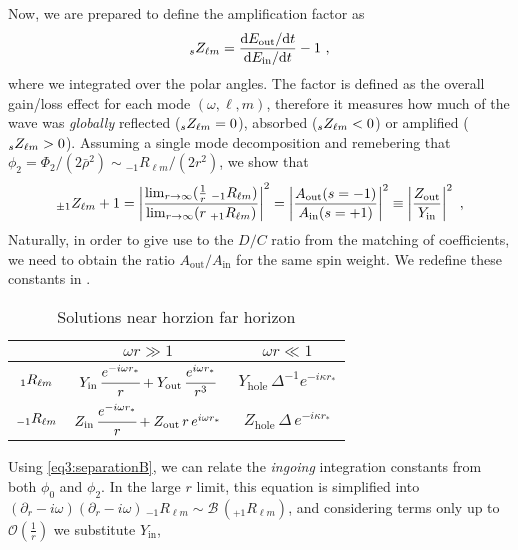 Now, we are prepared to define the amplification factor as 
\begin{align}
    \label{eq3:Zdef}
    \uu[s]{Z}{\ell m} = \frac{\dd E_\mathrm{out} / \dd t}{\dd E_\mathrm{in} / \dd t} - 1 ~,
\end{align}
where we integrated over the polar angles.
The factor is defined as the overall gain/loss effect for each mode $(\omega,\ell,m)$, therefore it measures how much of the wave was \emph{globally} reflected ($\uu[s]{Z}{\ell m}=0$), absorbed ($\uu[s]{Z}{\ell m}<0$) or amplified ($\uu[s]{Z}{\ell m}>0$).
Assuming a single mode decomposition and remebering that $\phi_2 = \Phi_2/(2 \bar{\rho}^2) \sim {}_{-1}R_{\ell m}/(2 r^2)$, we show that
\begin{align}
    \label{eq3:ZfactorAout2Ain0}
    \uu[\pm1]{Z}{\ell m} +1= \left| \frac{\lim_{r\to\infty} (\tfrac{1}{r} \; {}_{-1}R_{\ell m} )}{\lim_{r\to\infty} ( r \; {}_{+1}R_{\ell m} )} \right|^2 = \left| \frac{A_\mathrm{out}(s=-1)}{A_\mathrm{in}(s=+1)} \right|^2 \equiv \left| \frac{Z_\mathrm{out}}{Y_\mathrm{in}} \right|^2 ~,
\end{align}
Naturally, in order to give use to the $D/C$ ratio from the matching of coefficients, we need to obtain the ratio $A_\mathrm{out}/A_\mathrm{in}$ for the same spin weight. We redefine these constants in .
\begin{table}[h]
	\centering
	\tabulinesep=1.5mm
    \begin{tabu}{@{\hskip 0.25cm}c@{\hskip 0.75cm}c@{\hskip 0.75cm}c@{\hskip 0.25cm}}
        \hline
         & $\omega r \gg 1$ & $\omega r \ll 1$ \\
		\hline\hline
        $\uu[1]{R}{\ell m}$ & $Y_\mathrm{in}\,\cfrac{e^{-i \omega r_*}}{r} + Y_\mathrm{out}\, \cfrac{e^{i \omega r_*}}{r^3}$ & $Y_\mathrm{hole} \,\Delta^{-1} e^{-i \kappa r_{*}}$  \\
		\hline
        $\uu[-1]{R}{\ell m}$ & $Z_\mathrm{in}\,\cfrac{e^{-i \omega r_*}}{r} + Z_\mathrm{out}\, r \,e^{i \omega r_*}$ & $Z_\mathrm{hole} \,\Delta \,e^{-i \kappa r_{*}}$ \\
        \hline
    \end{tabu}
    \caption{Solutions near horzion far horizon \cite{Teukolsky1974}}
    \label{tb3:approximatedRsolutionsYZ}
\end{table}
Using \eqref{eq3:separationB}, we can relate the \emph{ingoing} integration constants from both $\phi_0$ and $\phi_2$.
In the large $r$ limit, this equation is simplified into $(\partial_r-i \omega)(\partial_r-i \omega) \,{}_{-1}R_{\ell m} \sim \mathscr{B} \,( {}_{+1}R_{\ell m} )$, and considering terms only up to $\mathscr{O}(\tfrac{1}{r})$ we substitute $Y_\mathrm{in}$,
